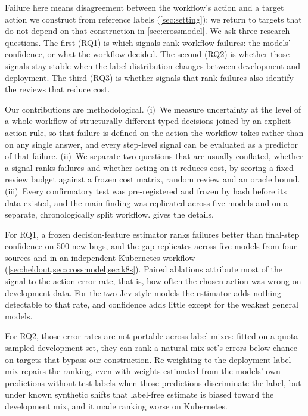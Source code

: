 Failure here means disagreement between the workflow's action and a
target action we construct from reference labels (\cref{sec:setting});
we return to targets that do not depend on that construction in
\cref{sec:crossmodel}. We ask three research questions. The first (RQ1)
is which signals rank workflow failures: the models' confidence, or what
the workflow decided. The second (RQ2) is whether those signals stay
stable when the label distribution changes between development and
deployment. The third (RQ3) is whether signals that rank failures also
identify the reviews that reduce cost.

Our contributions are methodological. (i)~We measure uncertainty at the
level of a whole workflow of structurally different typed decisions
joined by an explicit action rule, so that failure is defined on the
action the workflow takes rather than on any single answer, and every
step-level signal can be evaluated as a predictor of that failure.
(ii)~We separate two questions that are usually conflated, whether a
signal ranks failures and whether acting on it reduces cost, by scoring
a fixed review budget against a frozen cost matrix, random review and an
oracle bound. (iii)~Every confirmatory test was pre-registered and frozen
by hash before its data existed, and the main finding was replicated
across five models and on a separate, chronologically split workflow.
 gives the details.

For RQ1, a frozen decision-feature estimator
ranks failures better than final-step confidence on 500 new bugs, and
the gap replicates across five models from four sources and in an
independent Kubernetes workflow (\cref{sec:heldout,sec:crossmodel,sec:k8s}).
Paired ablations attribute most of the signal to the action error
rate, that is, how often the chosen action was wrong on development
data. For the two Jev-style models the estimator
adds nothing detectable to that rate, and confidence adds little except
for the weakest general models.

For RQ2, those error rates
are not portable across label mixes: fitted on a quota-sampled
development set, they can rank a natural-mix set's errors below chance on
targets that bypass our construction. Re-weighting to the deployment
label mix repairs the ranking, even with weights estimated from the
models' own predictions without test labels when those predictions
discriminate the label, but under known synthetic shifts that label-free
estimate is biased toward the development mix, and it made ranking
worse on Kubernetes.

